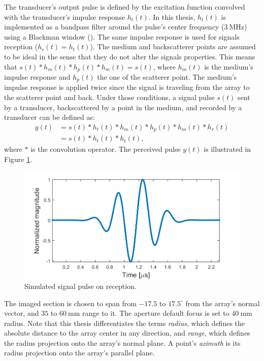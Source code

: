 The transducer's output pulse is defined by the excitation function convolved with the transducer's impulse response $h_t(t)$.
In this thesis, $h_t(t)$ is implemented as a bandpass filter around the pulse's center frequency ($3~$MHz) using a Blackman window (\cite{blackman}). The same impulse response is used for signals reception ($h_r(t) = h_t(t)$). The medium and backscatterer points are assumed to be ideal in the sense that they do not alter the signals properties. This means that $s(t) * h_m(t) * h_p(t) * h_m(t) = s(t)$, where $h_m(t)$ is the medium's impulse response and $h_p(t)$ the one of the scatterer point. The medium's impulse response is applied twice since the signal is traveling from the array to the scatterer point and back.
Under those conditions, a signal pulse $s(t)$ sent by a transducer, backscattered by a point in the medium, and recorded by a transducer can be defined as:
\begin{align}
    y(t) &= s(t) * h_t(t) * h_m(t) * h_p(t) * h_m(t) * h_r(t) \nonumber \\
    &= s(t) * h_t(t) * h_t(t),
\end{align}
\noindent
where $*$ is the convolution operator. The perceived pulse $y(t)$ is illustrated in Figure \ref{fig:pulse}.

\begin{figure}
    \centering
    \includegraphics[width=\linewidth]{./images/others/pulse.png}
    \caption{Simulated signal pulse on reception.}
    \label{fig:pulse}
\end{figure}

The imaged section is chosen to span from $-17.5$ to $17.5^\circ$ from the array's normal vector, and $35$ to $60~$mm range to it. The aperture default focus is set to $40~$mm radius. Note that this thesis differentiates the terms \textit{radius}, which defines the absolute distance to the array center in any direction, and \textit{range}, which defines the radius projection onto the array's normal plane. A point's \textit{azimuth} is its radius projection onto the array's parallel plane.


